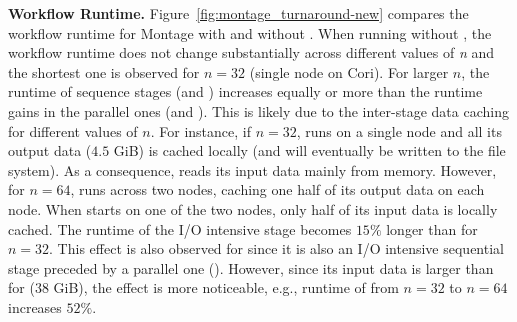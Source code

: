 \noindent\textbf{Workflow Runtime.}
Figure~\ref{fig:montage_turnaround-new} compares the workflow runtime for Montage
with and without \systemname. 
%
When running without \systemname, the workflow runtime does not
change substantially across different values of \textit{n} and
the shortest one is observed for $n=32$ (single node on Cori).
For larger $n$, the runtime of sequence stages
(\montageSecond and \montageFourth) increases equally or more
than the runtime gains in the parallel ones (\montageFirst and \montageThird).
This is likely due to the inter-stage data caching for different values of $n$.
For instance, if $n=32$, \montageFirst runs on a single node and all
its output data ($4.5$ GiB) is cached locally (and will eventually be
written to the file system). As a consequence, \montageSecond reads
its input data mainly from memory.  However, for $n=64$, \montageFirst
runs across two nodes, caching one half of its output data on each
node.  When \montageSecond starts on one of the two nodes, only half
of its input data is locally cached.  The runtime of the I/O intensive
stage becomes $15\%$ longer than for $n=32$.
This effect is also observed for \montageFourth since
it is also an I/O intensive sequential stage preceded
by a parallel one (\montageThird).
However, since its input data is larger than for
\montageSecond ($38$ GiB), the effect is more noticeable,
e.g., runtime of \montageFourth from $n=32$ to
$n=64$ increases $52\%$.
%
%

